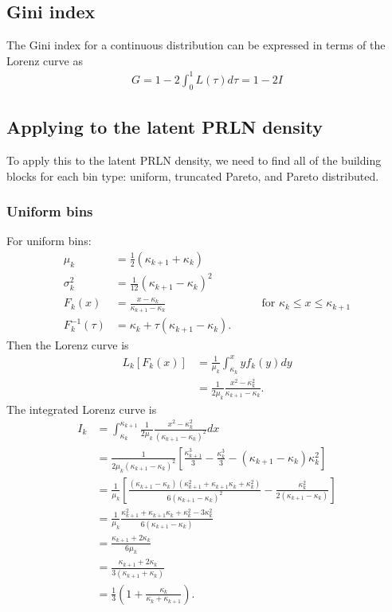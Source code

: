 \documentclass[12pt]{article}
\begin{document}
\subsection{Gini index}
The Gini index for a continuous distribution can be expressed in terms of the Lorenz curve as
\begin{align*}
G = 1 - 2\int_0^1L(\tau)d\tau = 1 - 2I
\end{align*}

\subsection{Applying to the latent PRLN density}
To apply this to the latent PRLN density, we need to find all of the building blocks for each bin type: uniform, truncated Pareto, and Pareto distributed.

\subsubsection{Uniform bins}
For uniform bins:
\begin{align*}
  \mu_k & = \frac{1}{2}(\kappa_{k+1} + \kappa_k) &&&\\
  \sigma_k^2 &= \frac{1}{12}(\kappa_{k+1} - \kappa_k)^2 &&&\\
  F_k(x) &= \frac{x - \kappa_k}{\kappa_{k+1} - \kappa_k} &&& \mbox{ for } \kappa_k \leq x \leq \kappa_{k+1} \\
  F^{-1}_k(\tau) & = \kappa_k + \tau (\kappa_{k + 1} - \kappa_k). &&&
\end{align*}
Then the Lorenz curve is
\begin{align*}
  L_k[F_k(x)] &= \frac{1}{\mu_k}\int_{\kappa_k}^x y f_k(y) dy \\
              &= \frac{1}{2\mu_k}\frac{x^2 - \kappa_k^2}{\kappa_{k+1} - \kappa_k}.
\end{align*}
The integrated Lorenz curve is
\begin{align*}
  I_k & = \int_{\kappa_k}^{\kappa_{k+1}}\frac{1}{2\mu_k}\frac{x^2 - \kappa_k^2}{(\kappa_{k+1} - \kappa_k)^2}dx \\
      & = \frac{1}{2\mu_k(\kappa_{k+1} - \kappa_k)^2}\left[\frac{\kappa_{k+1}^3}{3} - \frac{\kappa_{k}^3}{3} - (\kappa_{k+1} - \kappa_k)\kappa_k^2\right]\\
      & = \frac{1}{\mu_k}\left[\frac{(\kappa_{k+1} - \kappa_k)(\kappa_{k+1}^2 + \kappa_{k+1}\kappa_k + \kappa_k^2)}{6(\kappa_{k+1} - \kappa_k)^2} - \frac{\kappa_{k}^2}{2(\kappa_{k+1}-\kappa_k)}\right] \\
      & = \frac{1}{\mu_k}\frac{\kappa_{k+1}^2 + \kappa_{k+1}\kappa_{k} + \kappa_k^2 - 3 \kappa_k^2}{6(\kappa_{k+1} - \kappa_k)} \\
      & = \frac{\kappa_{k+1} + 2\kappa_k}{6\mu_k}\\
      & = \frac{\kappa_{k+1} + 2\kappa_k}{3(\kappa_{k+1} + \kappa_k)}\\
      & = \frac{1}{3}\left(1 + \frac{\kappa_k}{\kappa_k + \kappa_{k+1}}\right).
\end{align*}
\end{document}
